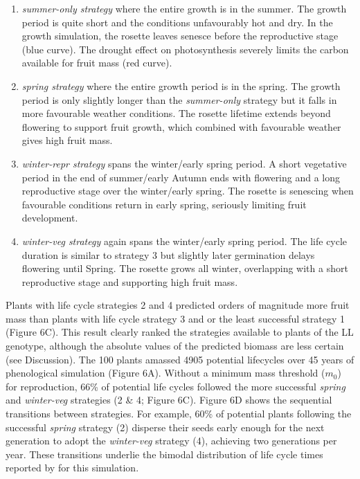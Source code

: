 \documentclass[phd]{infthesis}
\begin{document}
\begin{enumerate}
\def\labelenumi{\arabic{enumi}.}
\item
  \emph{summer-only strategy} where the entire growth is in the summer.
  The growth period is quite short and the conditions unfavourably hot
  and dry. In the growth simulation, the rosette leaves senesce before
  the reproductive stage (blue curve). The drought effect on
  photosynthesis severely limits the carbon available for fruit mass
  (red curve).
\item
  \emph{spring strategy} where the entire growth period is in the
  spring. The growth period is only slightly longer than the
  \emph{summer-only} strategy but it falls in more favourable weather
  conditions. The rosette lifetime extends beyond flowering to support
  fruit growth, which combined with favourable weather gives high fruit
  mass.
\item
  \emph{winter-repr strategy} spans the winter/early spring period. A
  short vegetative period in the end of summer/early Autumn ends with
  flowering and a long reproductive stage over the winter/early spring.
  The rosette is senescing when favourable conditions return in early
  spring, seriously limiting fruit development.
\item
  \emph{winter-veg strategy} again spans the winter/early spring period.
  The life cycle duration is similar to strategy 3 but slightly later
  germination delays flowering until Spring. The rosette grows all
  winter, overlapping with a short reproductive stage and supporting
  high fruit mass.
\end{enumerate}

Plants with life cycle strategies 2 and 4 predicted orders of magnitude
more fruit mass than plants with life cycle strategy 3 and or the least
successful strategy 1 (Figure 6C). This result clearly ranked the
strategies available to plants of the LL genotype, although the absolute
values of the predicted biomass are less certain (see Discussion). The
100 plants amassed 4905 potential lifecycles over 45 years of
phenological simulation (Figure 6A). Without a minimum mass threshold
($m_0$) for reproduction, 66\% of potential life
cycles followed the more successful \emph{spring} and \emph{winter-veg}
strategies (2 \& 4; Figure 6C). Figure 6D shows the sequential
transitions between strategies. For example, 60\% of potential plants
following the successful \emph{spring} strategy (2) disperse their seeds
early enough for the next generation to adopt the \emph{winter-veg}
strategy (4), achieving two generations per year. These transitions
underlie the bimodal distribution of life cycle times reported by \citet{burghardt_modeling_2015}
for this simulation.
\end{document}
